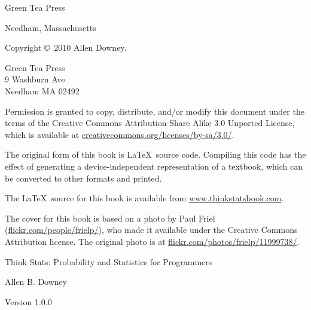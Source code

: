 \documentclass[10pt]{book}
\newcommand{\thetitle}{Think Stats: Probability and Statistics for Programmers}
\newcommand{\theversion}{1.0.0}
\begin{document}
\begin{latexonly}
\begin{flushright}
\vspace{0.5in}

{\Large Green Tea Press}

{\small Needham, Massachusetts}

\vfill

\end{flushright}


\pagebreak
\thispagestyle{empty}

{\small
Copyright \copyright ~2010 Allen Downey.


\vspace{0.2in}

\begin{flushleft}
Green Tea Press       \\
9 Washburn Ave \\
Needham MA 02492
\end{flushleft}

Permission is granted to copy, distribute, and/or modify this document
under the terms of the Creative Commons Attribution-Share Alike 3.0 Unported
License, which is available at \url{creativecommons.org/licenses/by-sa/3.0/}.

The original form of this book is \LaTeX\ source code.  Compiling this
code has the effect of generating a device-independent representation
of a textbook, which can be converted to other formats and printed.

The \LaTeX\ source for this book is available from
\url{www.thinkstatsbook.com}.

The cover for this book is based on a photo by Paul Friel
(\url{flickr.com/people/frielp/}), who made it available under
the Creative Commons Attribution license.  The original photo
is at \url{flickr.com/photos/frielp/11999738/}.

\vspace{0.2in}

} %

\end{latexonly}



\begin{htmlonly}


{\Large \thetitle}

{\large Allen B. Downey}

Version \theversion

\setcounter{chapter}{-1}

\end{htmlonly}
\end{document}
